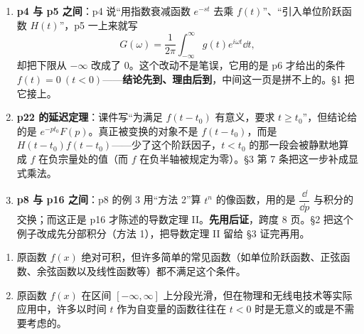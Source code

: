 \documentclass[11pt]{ctexart}
\begin{document}


\begin{enumerate}

\item \textbf{p4 与 p5 之间}：p4 说“用指数衰减函数 $e^{-st}$ 去乘 $f(t)$”、“引入单位阶跃函数 $H(t)$”，p5 一上来就写
\[ G(\omega)=\frac{1}{2\pi}\int_{-\infty}^{\infty}g(t)e^{i\omega t}\dd t ,\]
却把下限从 $-\infty$ 改成了 $0$。这个改动不是笔误，它用的是 p6 才给出的条件 $f(t)=0\ (t<0)$——\textbf{结论先到、理由后到}，中间这一页是拼不上的。§1 把它接上。

\item \textbf{p22 的延迟定理}：课件写“为满足 $f(t-t_0)$ 有意义，要求 $t\ge t_0$”，但结论给的是 $e^{-pt_0}F(p)$。真正被变换的对象不是 $f(t-t_0)$，而是 $H(t-t_0)f(t-t_0)$——少了这个阶跃因子，$t<t_0$ 的那一段会被静默地算成 $f$ 在负宗量处的值（而 $f$ 在负半轴被规定为零）。§3 第 7 条把这一步补成显式乘法。

\item \textbf{p8 与 p16 之间}：p8 的例 3 用“方法 2”算 $t^n$ 的像函数，用的是 $\dfrac{\dd}{\dd p}$ 与积分的交换；而这正是 p16 才陈述的导数定理 II。\textbf{先用后证}，跨度 8 页。§2 把这个例子改成先分部积分（方法 1），把导数定理 II 留给 §3 证完再用。

\end{enumerate}



\begin{enumerate}
\item 原函数 $f(x)$ 绝对可积，但许多简单的常见函数（如单位阶跃函数、正弦函数、余弦函数以及线性函数等）都不满足这个条件。
\item 原函数 $f(x)$ 在区间 $[-\infty,\infty]$ 上分段光滑，但在物理和无线电技术等实际应用中，许多以时间 $t$ 作为自变量的函数往往在 $t<0$ 时是无意义的或是不需要考虑的。
\end{enumerate}
\end{document}
